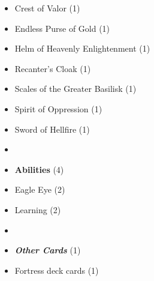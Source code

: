 \begin{multicols*}{3}
\begin{itemize}[leftmargin=0pt, label={}, noitemsep]
  \item Crest of Valor (1)
  \item Endless Purse of Gold (1)
  \item Helm of Heavenly Enlightenment (1)
  \item Recanter's Cloak (1)
  \item Scales of the Greater Basilisk (1)
  \item Spirit of Oppression (1)
  \item Sword of Hellfire (1)
  \item
  \item \textbf{Abilities} (4)
  \item Eagle Eye (2)
  \item Learning (2)
  \item
  \item \textbf{\emph{Other Cards}} (1)
  \item Fortress deck cards (1)
\end{itemize}

\end{multicols*}

